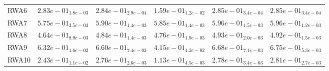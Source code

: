 \documentclass{article}
\begin{document}
\begin{table}
\begin{scriptsize}
\begin{tabular}{llllll}
RWA6 & $  2.83e-01_{ 1.8e-03}$ & $  2.84e-01_{ 2.9e-04}$ & $  1.59e-01_{ 1.2e-02}$ & \cellcolor{gray25}$  2.85e-01_{ 3.4e-04}$ & \cellcolor{gray95}$  2.85e-01_{ 3.4e-04}$ \\
RWA7 & $  5.75e-01_{ 3.5e-03}$ & $  5.90e-01_{ 1.4e-03}$ & $  5.85e-01_{ 1.4e-03}$ & \cellcolor{gray95}$  5.96e-01_{ 1.5e-03}$ & \cellcolor{gray25}$  5.96e-01_{ 1.2e-03}$ \\
RWA8 & $  4.64e-01_{ 8.9e-03}$ & $  4.84e-01_{ 1.4e-03}$ & $  4.76e-01_{ 1.9e-03}$ & \cellcolor{gray95}$  4.93e-01_{ 2.0e-03}$ & \cellcolor{gray25}$  4.92e-01_{ 1.5e-03}$ \\
RWA9 & $  6.32e-01_{ 1.6e-02}$ & $  6.60e-01_{ 7.4e-03}$ & $  4.15e-01_{ 4.2e-02}$ & \cellcolor{gray25}$  6.68e-01_{ 7.1e-03}$ & \cellcolor{gray95}$  6.75e-01_{ 5.3e-03}$ \\
RWA10 & $  2.43e-01_{ 1.1e-02}$ & $  2.76e-01_{ 2.6e-03}$ & $  1.13e-01_{ 4.5e-03}$ & \cellcolor{gray25}$  2.78e-01_{ 3.4e-03}$ & \cellcolor{gray95}$  2.81e-01_{ 2.7e-03}$ \\
\hline
\end{tabular}
\end{scriptsize}
\end{table}
\end{document}
